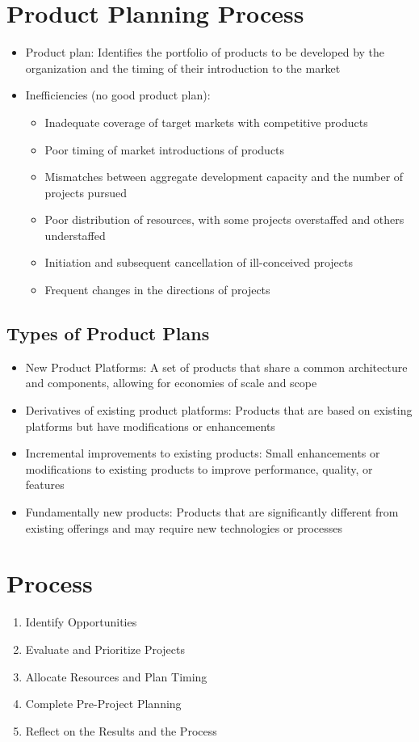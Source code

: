 \documentclass[a4paper,12pt,openany]{book}
\begin{document}
\section{Product Planning Process}
\begin{itemize}
    \item Product plan: Identifies the portfolio of products to be developed by the organization and the timing of their introduction to the market
    \item Inefficiencies (no good product plan):
    \begin{itemize}
        \item Inadequate coverage of target markets with competitive products
        \item Poor timing of market introductions of products
        \item Mismatches between aggregate development capacity and the number of projects pursued
        \item Poor distribution of resources, with some projects overstaffed and others understaffed
        \item Initiation and subsequent cancellation of ill-conceived projects
        \item Frequent changes in the directions of projects
    \end{itemize}
\end{itemize}
\subsection{Types of Product Plans}
\begin{itemize}
    \item New Product Platforms: A set of products that share a common architecture and components, allowing for economies of scale and scope
    \item Derivatives of existing product platforms: Products that are based on existing platforms but have modifications or enhancements
    \item Incremental improvements to existing products: Small enhancements or modifications to existing products to improve performance, quality, or features
    \item Fundamentally new products: Products that are significantly different from existing offerings and may require new technologies or processes
\end{itemize}
\section{Process}
\begin{enumerate}
    \item Identify Opportunities
    \item Evaluate and Prioritize Projects
    \item Allocate Resources and Plan Timing
    \item Complete Pre-Project Planning
    \item Reflect on the Results and the Process
\end{enumerate}
\end{document}
